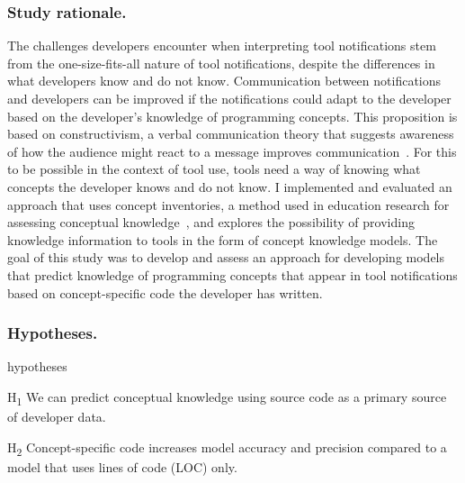 \documentclass{llncs}
\begin{document}
\subsubsection{Study rationale.}
The challenges developers encounter when interpreting tool notifications stem from the one-size-fits-all nature of tool notifications, despite the differences in what developers know and do not know.
Communication between notifications and developers can be improved if the notifications could adapt to the developer based on the developer's knowledge of programming concepts.
This proposition is based on constructivism, a verbal communication theory that suggests awareness of how the audience might react to a message improves communication~\cite{griffin2011first}. For this to be possible in the context of tool use, tools need a way of knowing what concepts the developer knows and do not know.
I implemented and evaluated an approach that uses concept inventories, a method used in education research for assessing conceptual knowledge~\cite{tew2010assessing}, and explores the possibility of providing knowledge information to tools in the form of concept knowledge models. 
The goal of this study was to develop and assess an approach for developing models that predict knowledge of programming concepts that appear in tool notifications based on concept-specific code the developer has written. 

\subsubsection{Hypotheses.}

\begin{labeling}{hypotheses}
	\item [H\textsubscript{1}] We can predict conceptual knowledge using source code as a primary source of developer data.
	\item [H\textsubscript{2}] Concept-specific code increases model accuracy and precision compared to a model that uses lines of code (LOC) only.
\end{labeling}
\end{document}
